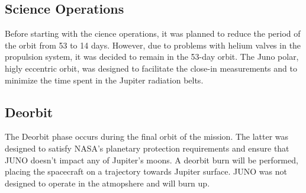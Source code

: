 \subsection{Science Operations}
Before starting with the cience operations, it was planned to reduce the period of the orbit from 53 to 14 days.
However, due to problems with helium valves in the propulsion system, it was decided to remain in the 53-day orbit. The Juno polar, higly eccentric orbit, was designed to facilitate the close-in measurements and to minimize the time spent in the Jupiter radiation belts.

\subsection{Deorbit}
The Deorbit phase occurs during the final orbit of the mission. The latter was designed to satisfy NASA's planetary protection requirements and ensure that JUNO doesn't impact any of Jupiter's moons. A deorbit burn will be performed, placing the spacecraft on a trajectory towards Jupiter surface.
JUNO was not designed to operate in the atmopshere and will burn up.